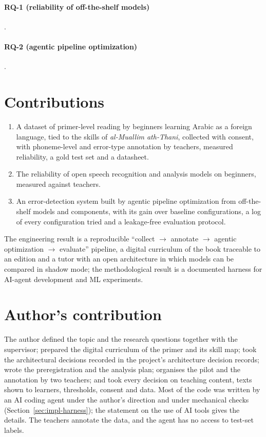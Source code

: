 \paragraph{RQ-1 (reliability of off-the-shelf models)} .
\paragraph{RQ-2 (agentic pipeline optimization)} .


\section{Contributions}

\begin{enumerate}
  \item[\textbf{C1.}] A dataset of primer-level reading by beginners learning Arabic as a foreign language, tied to
    the skills of \emph{al-Muallim ath-Thani}, collected with consent, with phoneme-level and error-type annotation
    by teachers, measured reliability, a gold test set and a datasheet.
  \item[\textbf{C2.}] The reliability of open speech recognition and analysis models on beginners, measured
    against teachers.
  \item[\textbf{C3.}] An error-detection system built by agentic pipeline optimization from off-the-shelf models and components, with its gain over baseline configurations, a log of every configuration tried and a leakage-free
    evaluation protocol.

\end{enumerate}

The engineering result is a reproducible ``collect $\to$ annotate $\to$ agentic optimization $\to$ evaluate'' pipeline, a
digital curriculum of the book traceable to an edition and a tutor with an open architecture in which models can
be compared in shadow mode; the methodological result is a documented harness for AI-agent development and ML
experiments.

\section{Author's contribution}\label{sec:concl-author}

The author defined the topic and the research questions together with the supervisor; prepared the digital
curriculum of the primer and its skill map; took the architectural decisions recorded in the project's
architecture decision records; wrote the preregistration and the analysis plan; organises the pilot and the
annotation by two teachers; and took every decision on teaching content, texts shown to learners, thresholds,
consent and data. Most of the code was written by an AI coding agent under the author's direction and under
mechanical checks (Section~\ref{sec:impl-harness}); the statement on the use of AI tools gives the details. The
teachers annotate the data, and the agent has no access to test-set labels.

